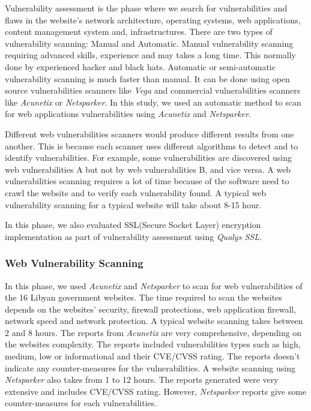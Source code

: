 \documentclass[conference,letterpaper]{IEEEtran}
\begin{document}
Vulnerability assessment\cite{shah2015overview} is the phase where we
search for vulnerabilities and flaws in the website’s network
architecture, operating systems, web applications, content management
system and, infrastructures. There are two types of vulnerability
scanning: Manual and Automatic.  Manual vulnerability scanning
requiring advanced skills, experience and may takes a long time. This
normally done by experienced hacker and black
hats\cite{mahmood2010moving}\cite{idris2017vulnerability}.  Automatic
or semi-automatic vulnerability scanning is much faster than
manual. It can be done using open source vulnerabilities scanners like
\emph{Vega} and commercial vulnerabilities scanners like
\emph{Acunetix} or \emph{Netsparker}.  In this study, we used an
automatic method to scan for web applications vulnerabilities using
\emph{Acunetix} and \emph{Netsparker}.



Different web vulnerabilities scanners would produce different results
from one another. This is because each scanner uses different
algorithms to detect and to identify vulnerabilities. For example,
some vulnerabilities are discovered using web vulnerabilities A but
not by web vulnerabilities B, and vice versa. A web vulnerabilities
scanning requires a lot of time because of the software need to crawl
the website and to verify each vulnerability found. A typical web
vulnerability scanning for a typical website will take about 8-15
hour.


In this phase, we also evaluated SSL(Secure Socket Layer) encryption
implementation as part of vulnerability assessment using \emph{Qualys
  SSL}.


\subsubsection{Web Vulnerability Scanning}

In this phase, we used \emph{Acunetix} and \emph{Netsparker} to scan
for web vulnerabilities of the 16 Libyan government websites. The time
required to scan the websites depends on the websites' security,
firewall protections, web application firewall, network speed and
network protection. A typical website scanning takes between 2 and 8
hours. The reports from \emph{Acunetix} are very comprehensive,
depending on the websites complexity. The reports included
vulnerabilities types such as high, medium, low or informational and
their CVE/CVSS rating. The reports doesn't indicate any
counter-measures for the vulnerabilities. A website scanning using
\emph{Netsparker} also takes from 1 to 12 hours. The reports generated
were very extensive and includes CVE/CVSS rating. However,
\emph{Netsparker} reports give some counter-measures for each
vulnerabilities.
\end{document}
